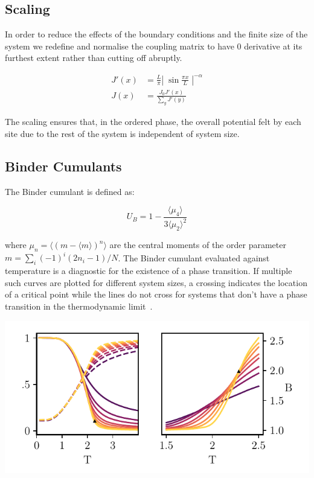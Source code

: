 \hypertarget{scaling}{%
\subsection{Scaling}\label{scaling}}

In order to reduce the effects of the boundary conditions and the finite size of the system we redefine and normalise the coupling matrix to have 0 derivative at its furthest extent rather than cutting off abruptly.

\[
\begin{aligned}
J'(x) &= \frac{L}{\pi}\left|\;\sin \frac{\pi x}{L}\;\right|^{-\alpha} \\
J(x) &= \frac{J_0 J'(x)}{\sum_y J'(y)}
\end{aligned}
\]

The scaling ensures that, in the ordered phase, the overall potential felt by each site due to the rest of the system is independent of system size.

\hypertarget{binder-cumulants}{%
\subsection{Binder Cumulants}\label{binder-cumulants}}

The Binder cumulant is defined as:

\[
U_B = 1 - \frac{\langle\mu_4\rangle}{3\langle\mu_2\rangle^2}
\]

where \(\mu_n = \langle(m - \langle m\rangle)^n\rangle\) are the central moments of the order parameter \(m = \sum_i (-1)^i (2n_i - 1) / N\). The Binder cumulant evaluated against temperature is a diagnostic for the existence of a phase transition. If multiple such curves are plotted for different system sizes, a crossing indicates the location of a critical point while the lines do not cross for systems that don't have a phase transition in the thermodynamic limit~\autocite{binderFiniteSizeScaling1981,musialMonteCarloSimulations2002}.

\includegraphics[width=1\textwidth,height=\textheight]{figure_code/fk_chapter/binder_cumulants/binder_cumulants}

